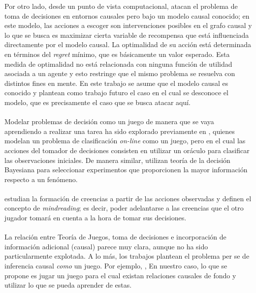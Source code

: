 \documentclass[11pt]{article}
\theoremstyle{plain}
\begin{document}
Por otro lado, desde un punto de vista computacional, \cite{lattimoreNIPS2016} atacan el problema de toma de decisiones en entornos causales pero bajo un modelo causal conocido; en este modelo, las acciones a escoger son intervenciones posibles en el grafo causal y lo que se busca es maximizar cierta variable de recompensa que está influenciada directamente por el modelo causal. La optimalidad de su acción está determinada en términos del \textit{regret} mínimo, que es básicamente un valor esperado. Esta medida de optimalidad no está relacionada con ninguna función de utilidad asociada a un agente y esto restringe que el mismo problema se resuelva con distintos fines en mente. En este trabajo se asume que el modelo causal es conocido y plantean como trabajo futuro el caso en el cual se desconoce el modelo, que es precisamente el caso que se busca atacar aquí.\\
\\
Modelar problemas de decisión como un juego de manera que se vaya aprendiendo a realizar una tarea ha sido explorado previamente en \cite{werling2015job}, quienes modelan un problema de clasificación \textit{on-line} como un juego, pero en el cual las acciones del tomador de decisiones consisten en utilizar un oráculo para clasificar las observaciones iniciales. De manera similar, \cite{javdani2014near} utilizan teoría de la decisión Bayesiana para seleccionar experimentos que proporcionen la mayor información respecto a un fenómeno.\\
\\
\cite{larrouy2017mindreading} estudian la formación de creencias a partir de las acciones observadas y definen el concepto de \textit{mindreading}; es decir, poder adelantarse a las creencias que el otro jugador tomará en cuenta a la hora de tomar sus decisiones.\\
\\
La relación entre Teoría de Juegos, toma de decisiones e incorporación de información adicional (causal) parece muy clara, aunque no ha sido particularmente explotada. A lo más, los trabajos plantean el problema per se de inferencia causal \textit{como} un juego. Por ejemplo, \cite{heckerman1995decision}, \cite{eberhardt2008causal}  En nuestro caso, lo que se propone es jugar un juego para el cual existan relaciones causales de fondo y utilizar lo que se pueda aprender de estas.
\end{document}
